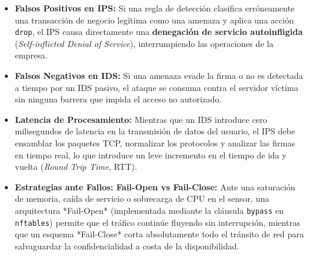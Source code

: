 \begin{itemize}
  \item \textbf{Falsos Positivos en IPS:} Si una regla de detección clasifica erróneamente una transacción de negocio legítima como una amenaza y aplica una acción \texttt{drop}, el IPS causa directamente una \textbf{denegación de servicio autoinfligida} (\textit{Self-inflicted Denial of Service}), interrumpiendo las operaciones de la empresa.
  \item \textbf{Falsos Negativos en IDS:} Si una amenaza evade la firma o no es detectada a tiempo por un IDS pasivo, el ataque se consuma contra el servidor víctima sin ninguna barrera que impida el acceso no autorizado.
  \item \textbf{Latencia de Procesamiento:} Mientras que un IDS introduce cero milisegundos de latencia en la transmisión de datos del usuario, el IPS debe ensamblar los paquetes TCP, normalizar los protocolos y analizar las firmas en tiempo real, lo que introduce un leve incremento en el tiempo de ida y vuelta (\textit{Round Trip Time}, RTT).
  \item \textbf{Estrategias ante Fallos: Fail-Open vs Fail-Close:} Ante una saturación de memoria, caída de servicio o sobrecarga de CPU en el sensor, una arquitectura *Fail-Open* (implementada mediante la cláusula \texttt{bypass} en \texttt{nftables}) permite que el tráfico continúe fluyendo sin interrupción, mientras que un esquema *Fail-Close* corta absolutamente todo el tránsito de red para salvaguardar la confidencialidad a costa de la disponibilidad.
\end{itemize}

